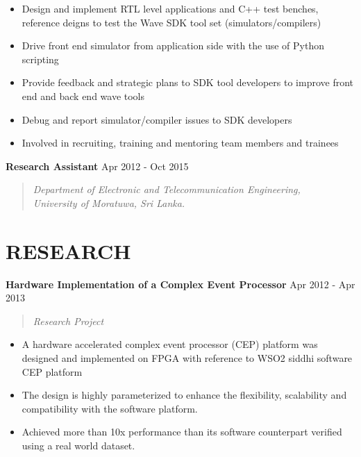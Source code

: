 \documentclass[mm]{res} %
\begin{document}
\begin{resume}
\begin{itemize}
	\item Design and implement RTL level applications and C++ test benches, reference deigns to test the Wave SDK tool set (simulators/compilers)
	\item Drive front end simulator from application side with the use of Python scripting
	\item Provide feedback and strategic plans to SDK tool developers to improve front end and back end wave tools
	\item Debug and report simulator/compiler issues to SDK developers
	\item Involved in recruiting, training and mentoring team members and trainees
\end{itemize}

\textbf{Research Assistant} \hfill Apr 2012 - Oct 2015
\begin{quote}
	\emph{Department of Electronic and Telecommunication Engineering, \\
		University of Moratuwa, Sri Lanka.}
\end{quote}


\vspace {2 mm}
\section{RESEARCH} 

\textbf{Hardware Implementation of a Complex Event Processor} \hfill Apr 2012 - Apr 2013
\begin{quote}
	\emph{Research Project}
\end{quote}

\begin{itemize} \itemsep -1pt %
	\item A hardware accelerated complex event processor (CEP) platform was designed and implemented on FPGA with reference to WSO2 siddhi software CEP platform
	\item The design is highly parameterized to enhance the flexibility, scalability and compatibility with the software platform.
	\item Achieved more than 10x performance than its software counterpart verified using a real world dataset.
\end{itemize}


\end{resume}
\end{document}
